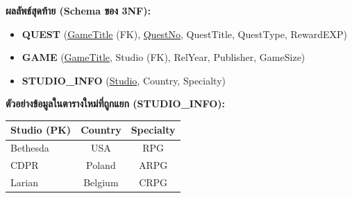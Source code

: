 \documentclass[a4paper,12pt]{article}
\begin{document}
\textbf{ผลลัพธ์สุดท้าย (Schema ของ 3NF):}
\begin{itemize}
    \item \textbf{QUEST} (\uline{GameTitle} (FK), \uline{QuestNo}, QuestTitle, QuestType, RewardEXP)
    \item \textbf{GAME} (\uline{GameTitle}, Studio (FK), RelYear, Publisher, GameSize)
    \item \textbf{STUDIO\_INFO} (\uline{Studio}, Country, Specialty)
\end{itemize}

\textbf{ตัวอย่างข้อมูลในตารางใหม่ที่ถูกแยก (STUDIO\_INFO):}
\begin{table}[H]
    \centering
    \footnotesize
    \begin{tabular}{|l|c|c|}
        \hline
        \rowcolor{cyan!20}
        \textbf{Studio} (PK) & \textbf{Country} & \textbf{Specialty} \\
        \hline
        Bethesda & USA & RPG \\
        CDPR & Poland & ARPG \\
        Larian & Belgium & CRPG \\
        \hline
    \end{tabular}
\end{table}
\end{document}
